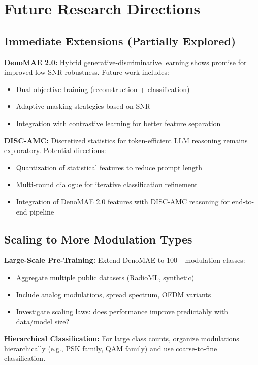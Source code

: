 \section{Future Research Directions}

\subsection{Immediate Extensions (Partially Explored)}

\textbf{DenoMAE 2.0:} Hybrid generative-discriminative learning shows promise for improved low-SNR robustness. Future work includes:
\begin{itemize}
    \item Dual-objective training (reconstruction + classification)
    \item Adaptive masking strategies based on SNR
    \item Integration with contrastive learning for better feature separation
\end{itemize}

\textbf{DISC-AMC:} Discretized statistics for token-efficient LLM reasoning remains exploratory. Potential directions:
\begin{itemize}
    \item Quantization of statistical features to reduce prompt length
    \item Multi-round dialogue for iterative classification refinement
    \item Integration of DenoMAE 2.0 features with DISC-AMC reasoning for end-to-end pipeline
\end{itemize}

\subsection{Scaling to More Modulation Types}

\textbf{Large-Scale Pre-Training:} Extend DenoMAE to 100+ modulation classes:
\begin{itemize}
    \item Aggregate multiple public datasets (RadioML, synthetic)
    \item Include analog modulations, spread spectrum, OFDM variants
    \item Investigate scaling laws: does performance improve predictably with data/model size?
\end{itemize}

\textbf{Hierarchical Classification:} For large class counts, organize modulations hierarchically (e.g., PSK family, QAM family) and use coarse-to-fine classification.

